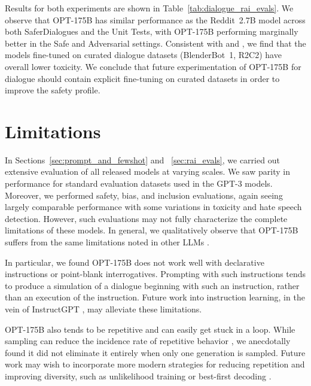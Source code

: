 Results for both experiments are shown in Table~\ref{tab:dialogue_rai_evals}. We observe that {OPT-175B} has similar performance as the Reddit~2.7B model across both SaferDialogues and the Unit Tests, with {OPT-175B} performing marginally better in the Safe and Adversarial settings. Consistent with \citet{roller-etal-2021-recipes} and \citet{xu2020recipes}, we find that the models fine-tuned on curated dialogue datasets (BlenderBot~1, R2C2) have overall lower toxicity. We conclude that future experimentation of {OPT-175B} for dialogue should contain explicit fine-tuning on curated datasets in order to improve the safety profile.

\section{Limitations}
\label{sec:limitations}

In Sections~\ref{sec:prompt_and_fewshot} and ~\ref{sec:rai_evals}, we carried out extensive evaluation of all released models at varying scales. We saw parity in performance for standard evaluation datasets used in the GPT-3 models. Moreover, we performed safety, bias, and inclusion evaluations, again seeing largely comparable performance with some variations in toxicity and hate speech detection. However, such evaluations may not fully characterize the complete limitations of these models. In general, we qualitatively observe that {OPT-175B} suffers from the same limitations noted in other LLMs \cite{brown2020gpt3,J1WhitePaper,thoppilan2022lamda,gopher2022,megatron2022,palm2022,bender2021dangers}.

In particular, we found {OPT-175B} does not work well with declarative instructions or point-blank interrogatives. Prompting with such instructions tends to produce a simulation of a dialogue beginning with such an instruction, rather than an execution of the instruction. Future work into instruction learning, in the vein of InstructGPT \cite{ouyang2022training}, may alleviate these limitations.

{OPT-175B} also tends to be repetitive and can easily get stuck in a loop. While sampling can reduce the incidence rate of repetitive behavior \cite{holtzman2020nucleus}, we anecdotally found it did not eliminate it entirely when only one generation is sampled. Future work may wish to incorporate more modern strategies for reducing repetition and improving diversity, such as unlikelihood training \cite{welleck2019neuraltext} or best-first decoding \cite{meister-etal-2020-best}.

